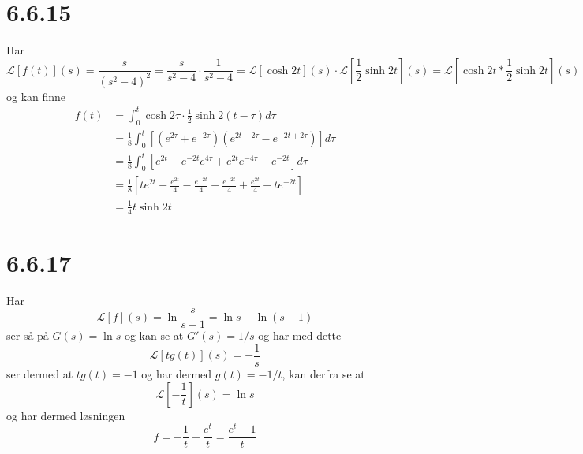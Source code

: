\documentclass{report}
\newcommand{\nbrack}[1]{\left( #1 \right)}
\newcommand{\bbrack}[1]{\left[ #1 \right]}
\newcommand{\Lplc}[1]{\mathscr{L}\bbrack{ #1 } (s)}
\begin{document}
\section*{6.6.15}
Har
\begin{equation}
  \label{eq:21}
  \Lplc{f(t)} = \frac{s}{\nbrack{s^{2}-4}^{2}} = \frac{s}{s^{2}-4} \cdot \frac{1}{s^{2}-4} = \Lplc{\cosh 2t} \cdot \Lplc{\frac{1}{2}\sinh 2t} = \Lplc{\cosh 2t * \frac{1}{2}\sinh 2t}
\end{equation}
og kan finne
\begin{equation}
  \label{eq:22}
  \begin{split}
    f(t) &= \int_{0}^{t} \cosh 2\tau \cdot \frac{1}{2} \sinh 2(t - \tau) d\tau \\
    &= \frac{1}{8} \int_{0}^{t} \bbrack{ \nbrack{ e^{2\tau} + e^{-2\tau} } \nbrack{e^{2t - 2\tau} - e^{-2t + 2\tau}} } d\tau \\
    &= \frac{1}{8} \int_{0}^{t} \bbrack{ e^{2t} - e^{-2t}e^{4\tau} + e^{2t}e^{-4\tau} - e^{-2t} } d\tau \\
    &= \frac{1}{8} \bbrack{ te^{2t} - \frac{e^{2t}}{4} - \frac{e^{-2t} }{4} + \frac{e^{-2t}}{4} + \frac{e^{2t}}{4} - te^{-2t} } \\
    &= \frac{1}{4} t \sinh 2t
  \end{split}
\end{equation}



\section*{6.6.17}
Har
\begin{equation}
  \label{eq:26}
  \Lplc{f} = \ln \frac{s}{s-1} = \ln s - \ln \nbrack{s-1}
\end{equation}
ser så på $G(s) = \ln s$ og kan se at $G'(s) = 1/s$ og har med dette
\begin{equation}
  \label{eq:31}
  \Lplc{t g(t)} = -\frac{1}{s}
\end{equation}
ser dermed at $tg(t) = -1$ og har dermed $g(t) = -1/t$, kan derfra se at
\begin{equation}
  \label{eq:35}
  \Lplc{-\frac{1}{t}} = \ln s
\end{equation}
og har dermed løsningen
\begin{equation}
  \label{eq:36}
  f = -\frac{1}{t} + \frac{e^{t}}{t} = \frac{e^{t}-1}{t}
\end{equation}
\end{document}

